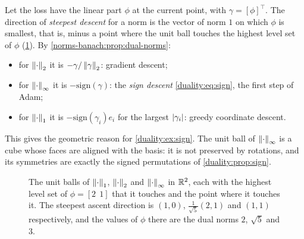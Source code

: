\begin{notechapter}
\begin{mlthread}
Let the loss have the linear part $\phi$ at the current point, with
$\gamma = [\phi]^\top$. The direction of \emph{steepest descent} for a norm
is the vector of norm $1$ on which $\phi$ is smallest, that is, minus a
point where the unit ball touches the highest level set of $\phi$
(\cref{norms-banach:fig:steepest}). By
\cref{norms-banach:prop:dual-norms}:
\begin{itemize}[nosep]
  \item for $\left\|\cdot\right\|_2$ it is $-\gamma/\left\|\gamma\right\|_2$: gradient
        descent;
  \item for $\left\|\cdot\right\|_\infty$ it is $-\mathrm{sign}(\gamma)$: the
        \emph{sign descent} \eqref{duality:eq:sign}, the first step of
        Adam;
  \item for $\left\|\cdot\right\|_1$ it is $-\mathrm{sign}(\gamma_i)e_i$ for the
        largest $\left|\gamma_i\right|$: greedy coordinate descent.
\end{itemize}
This gives the geometric reason for \cref{duality:ex:sign}. The unit ball
of $\left\|\cdot\right\|_\infty$ is a cube whose faces are aligned with the basis: it
is not preserved by rotations, and its symmetries are exactly the signed
permutations of \cref{duality:prop:sign}.
\end{mlthread}

\begin{figure}[ht]
\centering
{}
\caption{The unit balls of $\left\|\cdot\right\|_1$, $\left\|\cdot\right\|_2$ and
$\left\|\cdot\right\|_\infty$ in $\mathbb{R}^2$, each with the highest level set of
$\phi = [2\ \ 1]$ that it touches and the point where it touches it. The
steepest ascent direction is $(1, 0)$, $\frac1{\sqrt5}(2, 1)$ and $(1, 1)$
respectively, and the values of $\phi$ there are the dual norms $2$,
$\sqrt5$ and $3$.}
\label{norms-banach:fig:steepest}
\end{figure}


\end{notechapter}
